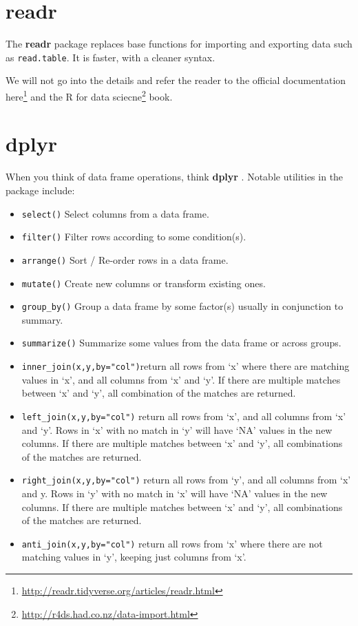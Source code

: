 \documentclass[]{book}
\providecommand{\tightlist}{%
  \setlength{\itemsep}{0pt}\setlength{\parskip}{0pt}}
\renewcommand{\href}[2]{#2\footnote{\url{#1}}}
\theoremstyle{definition}
\theoremstyle{definition}
\theoremstyle{definition}
\theoremstyle{remark}
\begin{document}
\hypertarget{readr}{%
\section{readr}\label{readr}}

The \textbf{readr} package \citep{readr} replaces base functions for importing and exporting data such as \texttt{read.table}.
It is faster, with a cleaner syntax.

We will not go into the details and refer the reader to the official documentation \href{http://readr.tidyverse.org/articles/readr.html}{here} and the \href{http://r4ds.had.co.nz/data-import.html}{R for data sciecne} book.

\hypertarget{dplyr}{%
\section{dplyr}\label{dplyr}}

When you think of data frame operations, think \textbf{dplyr} \citep{dplyr}.
Notable utilities in the package include:

\begin{itemize}
\tightlist
\item
  \texttt{select()} Select columns from a data frame.
\item
  \texttt{filter()} Filter rows according to some condition(s).
\item
  \texttt{arrange()} Sort / Re-order rows in a data frame.
\item
  \texttt{mutate()} Create new columns or transform existing ones.
\item
  \texttt{group\_by()} Group a data frame by some factor(s) usually in conjunction to summary.
\item
  \texttt{summarize()} Summarize some values from the data frame or across groups.
\item
  \texttt{inner\_join(x,y,by="col")}return all rows from `x' where there are matching values in `x', and all columns from `x' and `y'. If there are multiple matches between `x' and `y', all combination of the matches are returned.
\item
  \texttt{left\_join(x,y,by="col")} return all rows from `x', and all columns from `x' and `y'. Rows in `x' with no match in `y' will have `NA' values in the new columns. If there are multiple matches between `x' and `y', all combinations of the matches are returned.
\item
  \texttt{right\_join(x,y,by="col")} return all rows from `y', and all columns from `x' and y. Rows in `y' with no match in `x' will have `NA' values in the new columns. If there are multiple matches between `x' and `y', all combinations of the matches are returned.
\item
  \texttt{anti\_join(x,y,by="col")} return all rows from `x' where there are not matching values in `y', keeping just columns from `x'.
\end{itemize}
\end{document}
